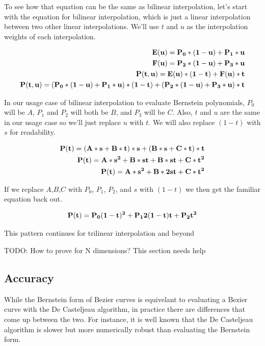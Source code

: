 \documentclass{jcgt}
\begin{document}
To see how that equation can be the same as bilinear interpolation, let's start with the equation for bilinear interpolation, which is just a linear interpolation between two other linear interpolations.  We'll use $t$ and $u$ as the interpolation weights of each interpolation.

\begin{equation}
\begin{split}
\bf{E(u)} = P_0*(1-u) + P_1*u \\
\bf{F(u)} = P_2*(1-u) + P_3*u \\
\bf{P(t,u)} = E(u)*(1-t) + F(u)*t \\
\bf{P(t,u)} = (P_0*(1-u) + P_1*u)*(1-t) + (P_2*(1-u) + P_3*u)*t
\end{split}
\label{eqn:bilinearinterpolation}
\end{equation}

In our usage case of bilinear interpolation to evaluate Bernstein polynomials, $P_0$ will be $A$, $P_1$ and $P_2$ will both be $B$, and $P_3$ will be $C$.  Also, $t$ and $u$ are the same in our usage case so we'll just replace $u$ with $t$.  We will also replace $(1-t)$ with $s$ for readability.

\begin{equation}
\begin{split}
\bf{P(t)} = (A*s+B*t)*s + (B*s+C*t)*t \\
\bf{P(t)} = A*s^2+B*st + B*st+C*t^2 \\
\bf{P(t)} = A*s^2+B*2st+C*t^2
\end{split}
\label{eqn:bilinearinterpolation2}
\end{equation}

If we replace $A$,$B$,$C$ with $P_0$, $P_1$, $P_2$, and $s$ with $(1-t)$ we then get the familiar equation back out.

\begin{equation}
\bf{P(t)} = P_0(1-t)^2+P_12(1-t)t+P_2t^2
\label{eqn:bilinearinterpolation3}
\end{equation}

This pattern continues for trilinear interpolation and beyond

TODO: How to prove for N dimensions?  This section needs help

\subsection{Accuracy}

While the Bernstein form of Bezier curves is equivelant to evaluating a Bezier curve with the De Casteljeau algorithm, in practice there are differences that come up between the two.  For instance, it is well known that the De Casteljeau algorithm is slower but more numerically robust than evaluating the Bernstein form.
\end{document}
